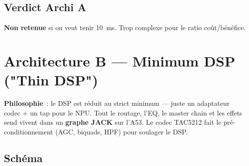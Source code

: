 \documentclass[11pt,a4paper]{article}
\begin{document}
\subsection{Verdict Archi A}
\textbf{Non retenue} si on veut tenir 10~ms. Trop complexe pour le ratio coût/bénéfice.

\clearpage
\section{Architecture B --- Minimum DSP ("Thin DSP")}
\label{sec:archiB}

\textbf{Philosophie}~: le DSP est réduit au strict minimum --- juste un adaptateur codec + un tap pour le NPU. Tout le routage, l'EQ, le master chain et les effets send vivent dans un \textbf{graphe JACK} sur l'A53. Le codec TAC5212 fait le pré-conditionnement (AGC, biquads, HPF) pour soulager le DSP.

\subsection{Schéma}
\end{document}
